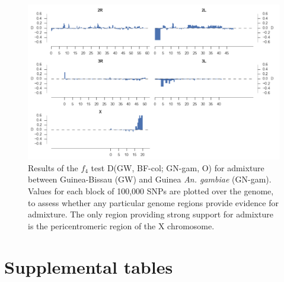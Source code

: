 \documentclass[a4paper,11pt,abstracton,hidelinks]{scrartcl}
\begin{document}
\clearpage
\begin{figure}[h!]
\centering
\includegraphics[width=1.1\textwidth,center]{artwork/chapter4/gwf4.pdf}
\caption{Results of the $f_4$ test D(GW, BF-col; GN-gam, O) for admixture between Guinea-Bissau (GW) and Guinea \textit{An. gambiae} (GN-gam).
%
Values for each block of 100,000 SNPs are plotted over the genome, to assess whether any particular genome regions provide evidence for admixture.
%
The only region providing strong support for admixture is the pericentromeric region of the X chromosome.
%
}
\label{fig:gwf4}
\end{figure}


\clearpage
\section{Supplemental tables}\label{sec:supplemental-tables}
\end{document}
